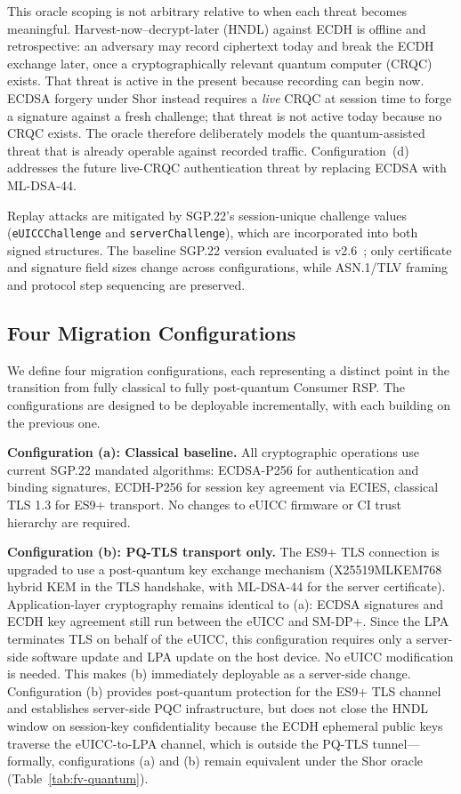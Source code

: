 \documentclass[a4paper,fleqn]{cas-sc}
\begin{document}
This oracle scoping is not arbitrary relative to when each threat
becomes meaningful. Harvest-now--decrypt-later (HNDL) against ECDH is
offline and retrospective: an adversary may record ciphertext today and
break the ECDH exchange later, once a cryptographically relevant quantum
computer (CRQC) exists. That threat is active in the present because
recording can begin now. ECDSA forgery under Shor instead requires a
\emph{live} CRQC at session time to forge a signature against a fresh
challenge; that threat is not active today because no CRQC exists. The
oracle therefore deliberately models the quantum-assisted threat that is
already operable against recorded traffic. Configuration~(d) addresses
the future live-CRQC authentication threat by replacing ECDSA with
ML-DSA-44.

Replay attacks are mitigated by SGP.22's session-unique challenge values
(\texttt{eUICCChallenge} and \texttt{serverChallenge}), which are
incorporated into both signed structures. The baseline SGP.22 version
evaluated is v2.6~\cite{gsma_sgp22_v26}; only certificate and signature
field sizes change across configurations, while ASN.1/TLV framing
and protocol step sequencing are preserved.

\subsection{Four Migration Configurations}
\label{sec:sys-configs}

We define four migration configurations, each representing a distinct
point in the transition from fully classical to fully post-quantum
Consumer RSP. The configurations are designed to be deployable
incrementally, with each building on the previous one.

\textbf{Configuration (a): Classical baseline.} All cryptographic
operations use current SGP.22 mandated algorithms: ECDSA-P256 for
authentication and binding signatures, ECDH-P256 for session key
agreement via ECIES, classical TLS 1.3 for ES9+ transport. No changes
to eUICC firmware or CI trust hierarchy are required.

\textbf{Configuration (b): PQ-TLS transport only.} The ES9+ TLS
connection is upgraded to use a post-quantum key exchange mechanism
(X25519MLKEM768 hybrid KEM in the TLS handshake, with ML-DSA-44 for
the server certificate). Application-layer cryptography remains
identical to (a): ECDSA signatures and ECDH key agreement still run
between the eUICC and SM-DP+. Since the LPA terminates TLS on behalf
of the eUICC, this configuration requires only a server-side software
update and LPA update on the host device. No eUICC modification is
needed. This makes (b) immediately deployable as a server-side change.
Configuration (b) provides post-quantum protection for the ES9+ TLS
channel and establishes server-side PQC infrastructure, but does not close
the HNDL window on session-key confidentiality because the ECDH ephemeral
public keys traverse the eUICC-to-LPA channel, which is outside the
PQ-TLS tunnel---formally, configurations (a) and (b) remain equivalent
under the Shor oracle (Table~\ref{tab:fv-quantum}).
\end{document}
